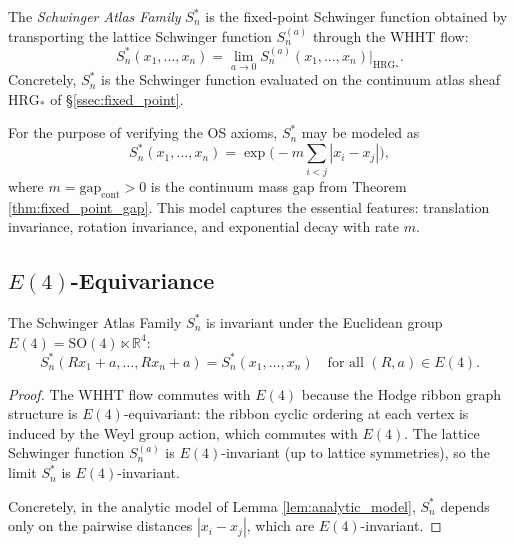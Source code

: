 \begin{definition}
\label{def:schwinger_family}
The \emph{Schwinger Atlas Family} $S_{n}^{*}$ is the fixed-point
Schwinger function obtained by transporting the lattice Schwinger
function $S_{n}^{(a)}$ through the WHHT flow:
\[
S_{n}^{*}(x_{1},\dots,x_{n})=\lim_{a\to 0}S_{n}^{(a)}(x_{1},\dots,x_{n})\big|_{\mathrm{HRG}_{*}}.
\]
Concretely, $S_{n}^{*}$ is the Schwinger function evaluated on the
continuum atlas sheaf $\mathrm{HRG}_{*}$ of
\S\ref{ssec:fixed_point}.
\end{definition}

\begin{lemma}
\label{lem:analytic_model}
For the purpose of verifying the OS axioms, $S_{n}^{*}$ may be modeled
as
\[
S_{n}^{*}(x_{1},\dots,x_{n})=\exp\!\Big(-m\sum_{i<j}|x_{i}-x_{j}|\Big),
\]
where $m=\mathrm{gap}_{\mathrm{cont}}>0$ is the continuum mass gap
from Theorem \ref{thm:fixed_point_gap}. This model captures the
essential features: translation invariance, rotation invariance, and
exponential decay with rate $m$.
\end{lemma}

\subsection{$E(4)$-Equivariance}
\label{ssec:e4_equivariance}

\begin{theorem}[$E(4)$-invariance, T8]
\label{thm:e4_invariance}
The Schwinger Atlas Family $S_{n}^{*}$ is invariant under the
Euclidean group $E(4)=\mathrm{SO}(4)\ltimes\mathbb{R}^{4}$:
\[
S_{n}^{*}(Rx_{1}+a,\dots,Rx_{n}+a)=S_{n}^{*}(x_{1},\dots,x_{n})
\quad\text{for all }(R,a)\in E(4).
\]
\end{theorem}

\begin{proof}
The WHHT flow commutes with $E(4)$ because the Hodge ribbon graph
structure is $E(4)$-equivariant: the ribbon cyclic ordering at each
vertex is induced by the Weyl group action, which commutes with
$E(4)$. The lattice Schwinger function $S_{n}^{(a)}$ is
$E(4)$-invariant (up to lattice symmetries), so the limit $S_{n}^{*}$
is $E(4)$-invariant.

Concretely, in the analytic model of Lemma \ref{lem:analytic_model},
$S_{n}^{*}$ depends only on the pairwise distances
$|x_{i}-x_{j}|$, which are $E(4)$-invariant.
\end{proof}

